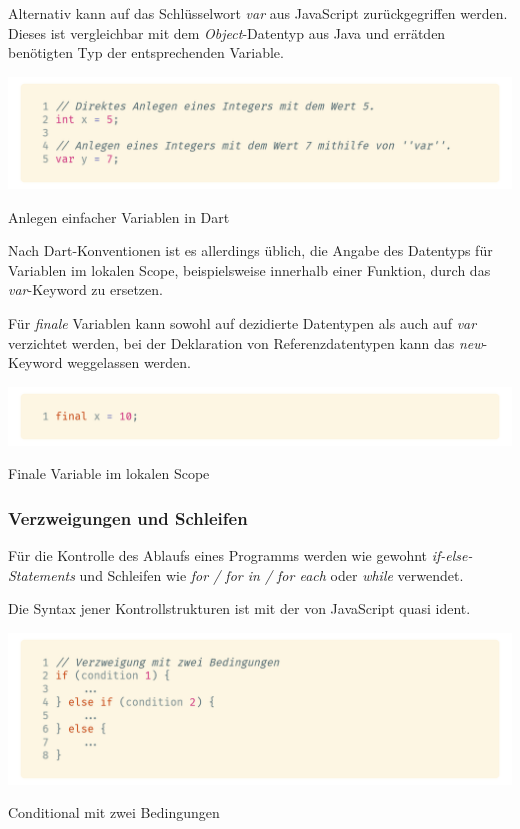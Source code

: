 Alternativ kann auf das Schlüsselwort \textit{var} aus JavaScript zurückgegriffen werden. Dieses ist vergleichbar mit dem \textit{Object}-Datentyp aus Java und \glqq errät\grqq\space den benötigten Typ der entsprechenden Variable.

\begin{code}[h]
    \centering
    \includegraphics[width=1\textwidth]{images/Dart/theory/dartVariables.png}
    \caption{Anlegen einfacher Variablen in Dart}
\end{code}

Nach Dart-Konventionen ist es allerdings üblich, die Angabe des Datentyps für Variablen im lokalen Scope, beispielsweise innerhalb einer Funktion, durch das \textit{var}-Keyword zu ersetzen. \cite{dartdesignvariables2021}

Für \textit{finale} Variablen kann sowohl auf dezidierte Datentypen als auch auf \textit{var} verzichtet werden, bei der Deklaration von Referenzdatentypen kann das \textit{new}-Keyword 
weggelassen werden.

\begin{code}[h]
    \centering
    \includegraphics[width=1\textwidth]{images/Dart/theory/dartLocalFinal.png}
    \caption{Finale Variable im lokalen Scope}
\end{code}

\subsubsection{Verzweigungen und Schleifen}

Für die Kontrolle des Ablaufs eines Programms werden wie gewohnt \textit{if-else-Statements} und Schleifen
wie \textit{for / for in / for each} oder \textit{while} verwendet.

Die Syntax jener Kontrollstrukturen ist mit der von JavaScript quasi ident.

\begin{code}[h]
    \centering
    \includegraphics[width=1\textwidth]{images/Dart/theory/dartConditional.png}
    \caption{Conditional mit zwei Bedingungen}
\end{code}

